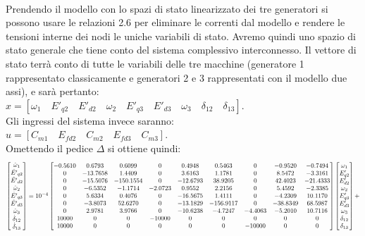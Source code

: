 \documentclass[Lau,noexaminfo]{sapthesis}
\begin{document}
	\\
	Prendendo il modello con lo spazi di stato linearizzato dei tre generatori si possono usare le relazioni 2.6 per eliminare le correnti dal modello e rendere le tensioni interne dei nodi le uniche variabili di stato. Avremo quindi uno spazio di stato generale che tiene conto del sistema complessivo interconnesso. Il vettore di stato terrà conto di tutte le variabili delle tre macchine (generatore 1 rappresentato classicamente e generatori 2 e 3 rappresentati con il modello due assi), e sarà pertanto:\\
	$x=[\omega_1 \quad E'_{q2} \quad E'_{d2} \quad \omega_2 \quad E'_{q3} \quad E'_{d3} \quad \omega_3 \quad \delta_{12} \quad \delta_{13}]$.\\
	Gli ingressi del sistema invece saranno:\\
	$u=[C_{m1} \quad E_{fd2} \quad C_{m2} \quad E_{fd3} \quad C_{m3}]$.\\
	Omettendo il pedice $\Delta$ si ottiene quindi:
	\begin{equation*}
	\centering
	\resizebox{1.15\hsize}{!}{$%
	\begin{bmatrix}
	\dot{\omega}_1\\
	\dot{E'}_{q2}\\
	\dot{E'}_{d2}\\
	\dot{\omega}_2\\
	\dot{E'}_{q3}\\
	\dot{E'}_{d3}\\
	\dot{\omega}_3\\
	\dot{\delta}_{12}\\
	\dot{\delta}_{13}
	\end{bmatrix}=10^{-4}
	\begin{bmatrix}
	-0.5610 & 0.6793 & 0.6099 & 0 & 0.4948 & 0.5463 & 0 & -0.9520 & -0.7494\\
	0 & -13.7658 & 1.4409 & 0 & 3.6163 & 1.1781 & 0 & 8.5472 & -3.3161\\
	0 & -15.5076 & -150.1554 & 0 & -12.6793 & 38.9205 & 0 & 42.4023 & -21.4333\\
	0 & -6.5352 & -1.1714 & -2.0723 & 0.9552 & 2.2156 & 0 & 5.4592 & -2.3385\\
	0 & 5.6334 & 0.4076 & 0 & -16.5675 & 1.4111 & 0 & -4.2309 & 10.1170\\
	0 & -3.8073 & 52.6270 & 0 & -13.1829 & -156.9117 & 0 & -38.8349 & 68.5987\\
	0 & 2.9781 & 3.9766 & 0 & -10.6238 & -4.7247 & -4.4063 & -5.2010 & 10.7116\\
	10000 & 0 & 0 & -10000 & 0 & 0 & 0 & 0 & 0\\
	10000 & 0 & 0 & 0 & 0 & 0 & -10000 & 0 & 0
	\end{bmatrix}
	\begin{bmatrix}
	\omega_1\\
	E'_{q2}\\
	E'_{d2}\\
	\omega_2\\
	E'_{q3}\\
	E'_{d3}\\
	\omega_3\\
	\delta_{12}\\
	\delta_{13}
	\end{bmatrix}+$%
	}%
	\end{equation*}
\end{document}
